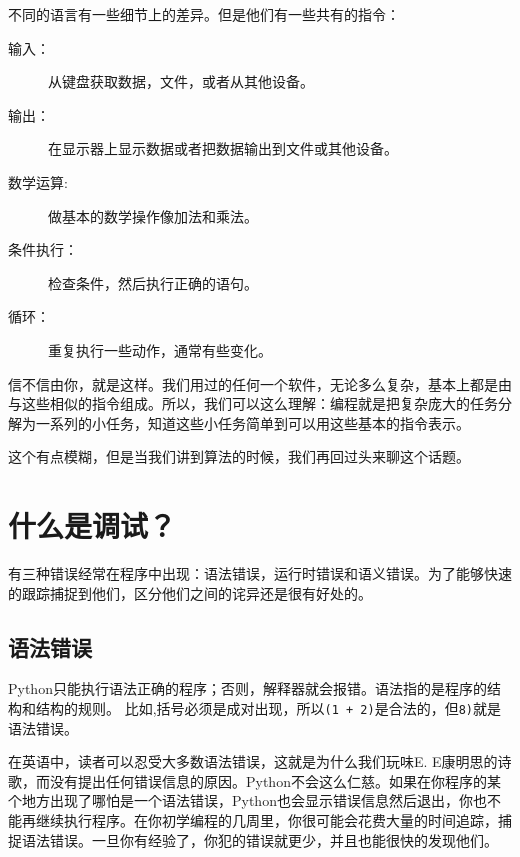 不同的语言有一些细节上的差异。但是他们有一些共有的指令：

\begin{description}

\item[输入：] 从键盘获取数据，文件，或者从其他设备。

\item[输出：] 在显示器上显示数据或者把数据输出到文件或其他设备。

\item[数学运算:] 做基本的数学操作像加法和乘法。

\item[条件执行：]检查条件，然后执行正确的语句。

\item[循环：]重复执行一些动作，通常有些变化。

\end{description}

信不信由你，就是这样。我们用过的任何一个软件，无论多么复杂，基本上都是由与这些相似的指令组成。所以，我们可以这么理解：编程就是把复杂庞大的任务分解为一系列的小任务，知道这些小任务简单到可以用这些基本的指令表示。


这个有点模糊，但是当我们讲到算法的时候，我们再回过头来聊这个话题。

\section{什么是调试？}

有三种错误经常在程序中出现：语法错误，运行时错误和语义错误。为了能够快速的跟踪捕捉到他们，区分他们之间的诧异还是很有好处的。

\subsection{语法错误}

Python只能执行语法正确的程序；否则，解释器就会报错。语法指的是程序的结构和结构的规则。
比如,括号必须是成对出现，所以{\tt (1 + 2)}是合法的，但{\tt 8)}就是语法错误。


在英语中，读者可以忍受大多数语法错误，这就是为什么我们玩味E. E康明思的诗歌，而没有提出任何错误信息的原因。Python不会这么仁慈。如果在你程序的某个地方出现了哪怕是一个语法错误，Python也会显示错误信息然后退出，你也不能再继续执行程序。在你初学编程的几周里，你很可能会花费大量的时间追踪，捕捉语法错误。一旦你有经验了，你犯的错误就更少，并且也能很快的发现他们。

